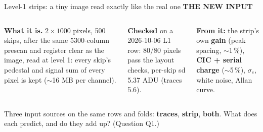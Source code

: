 \documentclass[aspectratio=169,11pt]{beamer}
\newcommand{\eyebrow}[2][trace]{{\color{#1}\scriptsize\bfseries\MakeUppercase{#2}}\par\vspace{0.1em}}
\begin{document}
\begin{frame}{Level-1 strips: a tiny image read exactly like the real one}
\eyebrow[image]{The new input}
\begin{columns}[T]
\small
\textbf{What it is.} $2\times1000$ pixels, 500 skips, after the same 5300-column prescan and register clear as the image, read at level 1: every skip's pedestal and signal sum of every pixel is kept ($\sim$16 MB per channel).\par\medskip
\textbf{Checked} on a 2026-10-06 L1 row: 80/80 pixels pass the layout checks, per-skip sd 5.37 ADU (traces 5.6).\par\medskip
\textbf{From it:} the strip's own \textbf{gain} (peak spacing, $\sim$1\,\%), \textbf{CIC + serial charge} ($\sim$5\,\%), $\sigma_e$, white noise, Allan curve.
\end{columns}
\vspace{0.6em}
\scriptsize Three input sources on the same rows and folds: \textbf{traces}, \textbf{strip}, \textbf{both}. What does each predict, and do they add up? (Question Q1.)
\end{frame}
\end{document}
